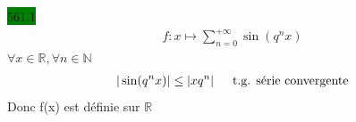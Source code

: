 \documentclass{article}
\begin{document}
\noindent \colorbox{green}{561.1}\\ 
\begin{align*}
    f:x \mapsto \sum_{n=0}^{+\infty}\sin(q^{n}x)
\end{align*}
\(\forall x \in \mathbb{R}, \forall n \in \mathbb{N}\)
\begin{align*}
  |\sin(q^{n}x)| \leq |x q^{n}| \indent \text{t.g. série convergente}
\end{align*}
Donc f(x) est définie sur \(\mathbb{R}\)
\end{document}

